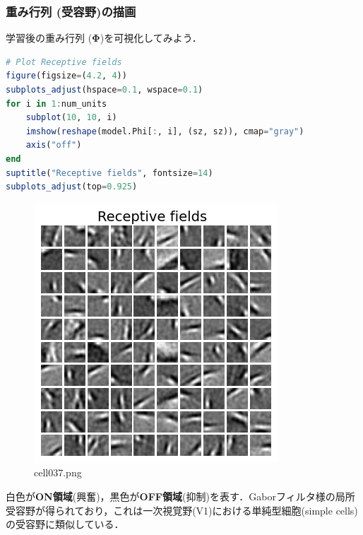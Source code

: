 \subsubsection{重み行列 (受容野)の描画}
学習後の重み行列  ($\mathbf{\Phi}$)を可視化してみよう．
\begin{lstlisting}[language=julia]
# Plot Receptive fields
figure(figsize=(4.2, 4))
subplots_adjust(hspace=0.1, wspace=0.1)
for i in 1:num_units
    subplot(10, 10, i)
    imshow(reshape(model.Phi[:, i], (sz, sz)), cmap="gray")
    axis("off")
end
suptitle("Receptive fields", fontsize=14)
subplots_adjust(top=0.925)
\end{lstlisting}
\begin{figure}[ht]
	\centering
	\includegraphics[scale=0.8, max width=\linewidth]{./fig/energy-based-model/sparse-coding/cell037.png}
	\caption{cell037.png}
	\label{cell037.png}
\end{figure}
白色が\textbf{ON領域}(興奮)，黒色が\textbf{OFF領域}(抑制)を表す．Gaborフィルタ様の局所受容野が得られており，これは一次視覚野(V1)における単純型細胞(simple cells)の受容野に類似している．
